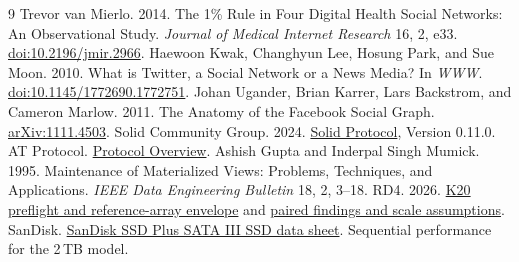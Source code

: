 \documentclass[sigconf,nonacm]{acmart}
\newcommand{\record}[2]{\href{https://github.com/jacoby149/web10/blob/2f397cb13/research/experiments/costfn/#1}{#2}}
\begin{document}
\begin{thebibliography}{9}
 Trevor van Mierlo. 2014. The 1\% Rule in Four Digital Health Social Networks: An Observational Study. \emph{Journal of Medical Internet Research} 16, 2, e33. \href{https://doi.org/10.2196/jmir.2966}{doi:10.2196/jmir.2966}.
 Haewoon Kwak, Changhyun Lee, Hosung Park, and Sue Moon. 2010. What is Twitter, a Social Network or a News Media? In \emph{WWW}. \href{https://doi.org/10.1145/1772690.1772751}{doi:10.1145/1772690.1772751}.
 Johan Ugander, Brian Karrer, Lars Backstrom, and Cameron Marlow. 2011. The Anatomy of the Facebook Social Graph. \href{https://arxiv.org/abs/1111.4503}{arXiv:1111.4503}.
 Solid Community Group. 2024. \href{https://solidproject.org/TR/protocol}{Solid Protocol}, Version 0.11.0.
 AT Protocol. \href{https://atproto.com/guides/overview}{Protocol Overview}.
 Ashish Gupta and Inderpal Singh Mumick. 1995. Maintenance of Materialized Views: Problems, Techniques, and Applications. \emph{IEEE Data Engineering Bulletin} 18, 2, 3--18.
 RD4. 2026. \record{HYBRID-K20-PREFLIGHT.md}{K20 preflight and reference-array envelope} and \record{HYBRID-K20-FINDINGS.md}{paired findings and scale assumptions}.
 SanDisk. \href{https://documents.sandisk.com/content/dam/asset-library/en_us/assets/public/sandisk/product/internal-drives/ssd-plus-sata-iii-ssd/data-sheet-ssd-plus-sata-iii-ssd.pdf}{SanDisk SSD Plus SATA III SSD data sheet}. Sequential performance for the 2\,TB model.
\end{thebibliography}
\end{document}
